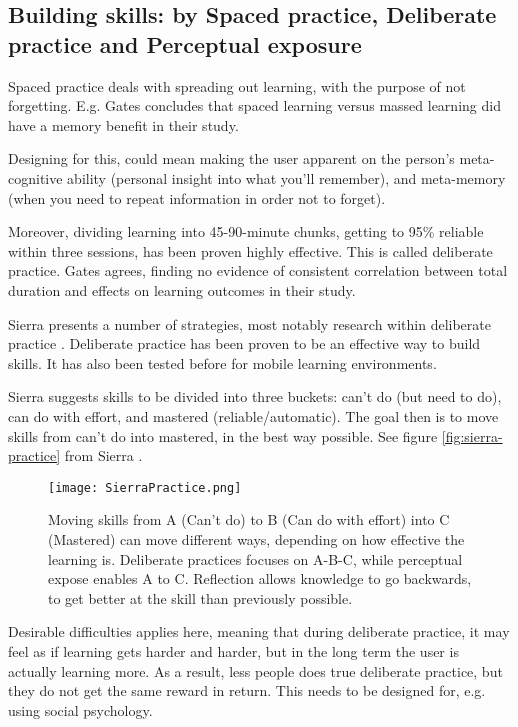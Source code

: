   \subsection{Building skills: by Spaced practice, Deliberate practice and Perceptual exposure}

  Spaced practice deals with spreading out learning, with the purpose of not forgetting. E.g. Gates \cite{Gates} concludes that spaced learning versus massed learning did have a memory benefit in their study.

  Designing for this, could mean making the user apparent on the person's meta-cognitive ability (personal insight into what you'll remember), and meta-memory (when you need to repeat information in order not to forget).

  Moreover, dividing learning into 45-90-minute chunks, getting to 95\% reliable within three sessions, has been proven highly effective. This is called deliberate practice. Gates \cite{Gates} agrees, finding no evidence of consistent correlation between total duration and effects on learning outcomes in their study.

  Sierra presents a number of strategies, most notably research within deliberate practice \cite{yengin} \cite{sierra}. Deliberate practice has been proven to be an effective way to build skills. It has also been tested before for mobile learning environments. \cite{yengin}

  Sierra \cite{sierra} suggests skills to be divided into three buckets: can't do (but need to do), can do with effort, and mastered (reliable/automatic). The goal then is to move skills from can't do into mastered, in the best way possible. See figure \ref{fig:sierra-practice} from Sierra \cite{sierra}.

  \begin{figure}[h]
    \centering
    \texttt{[image: SierraPractice.png]}
    \caption{Moving skills from A (Can't do) to B (Can do with effort) into C (Mastered) can move different ways, depending on how effective the learning is. Deliberate practices focuses on A-B-C, while perceptual expose enables A to C. Reflection allows knowledge to go backwards, to get better at the skill than previously possible.}
    \label{fig:iterationprocess}
\end{figure}

  Desirable difficulties applies here, meaning that during deliberate practice, it may feel as if learning gets harder and harder, but in the long term the user is actually learning more. As a result, less people does true deliberate practice, but they do not get the same reward in return. This needs to be designed for, e.g. using social psychology.


